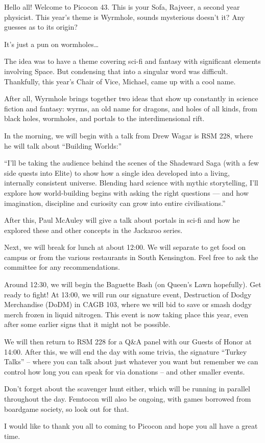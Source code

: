 
\begingroup
\setlength{\parskip}{9pt}  

Hello all! Welcome to Picocon 43. This is your Sofa, Rajveer, a second year physicist. This year's theme is Wyrmhole, sounds mysterious doesn’t it? Any guesses as to its origin? 

It’s just a pun on wormholes…

The idea was to have a theme covering sci-fi and fantasy with significant elements involving Space. But condensing that into a singular word was difficult. Thankfully, this year’s Chair of Vice, Michael, came up with a cool name.

After all, Wyrmhole brings together two ideas that show up constantly in science fiction and fantasy: wyrms, an old name for dragons, and holes of all kinds, from black holes, wormholes, and portals to the interdimensional rift.

In the morning, we will begin with a talk from Drew Wagar is RSM 228, where he will talk about “Building Worlds:”

“I’ll be taking the audience behind the scenes of the Shadeward Saga (with a few side quests into Elite) to show how a single idea developed into a living, internally consistent universe. Blending hard science with mythic storytelling, I’ll explore how world-building begins with asking the right questions — and how imagination, discipline and curiosity can grow into entire civilisations.”

After this, Paul McAuley will give a talk about portals in sci-fi and how he explored these and other concepts in the Jackaroo series.

Next, we will break for lunch at about 12:00. We will separate to get food on campus or from the various restaurants in South Kensington. Feel free to ask the committee for any recommendations.

Around 12:30, we will begin the Baguette Bash (on Queen’s Lawn hopefully). Get ready to fight!
At 13:00, we will run our signature event, Destruction of Dodgy Merchandise (DoDM) in CAGB 103, where we will bid to save or smash dodgy merch frozen in liquid nitrogen. This event is now taking place this year, even after some earlier signs that it might not be possible.


We will then return to RSM 228 for a Q\&A panel with our Guests of Honor at 14:00. After this, we will end the day with some trivia, the signature “Turkey Talks” –  where you can talk about just whatever you want but remember we can control how long you can speak for via donations – and other smaller events.

Don’t forget about the scavenger hunt either, which will be running in parallel throughout the day. Femtocon will also be ongoing, with games borrowed from boardgame society, so look out for that.

I would like to thank you all to coming to Picocon and hope you all have a great time.





\endgroup

